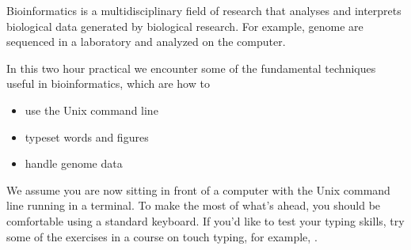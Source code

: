 Bioinformatics is a multidisciplinary field of research that analyses
and interprets biological data generated by biological research. For
example, genome are sequenced in a laboratory and analyzed on the
computer.

In this two hour practical we encounter some of the fundamental
techniques useful in bioinformatics, which are how to
\begin{itemize}
\item use the Unix command line
\item typeset words and figures
\item handle genome data
\end{itemize}
We assume you are now sitting in front of a computer with the Unix
command line running in a terminal. To make the most of what's ahead,
you should be comfortable using a standard keyboard. If you'd like to
test your typing skills, try some of the exercises in a course on
touch typing, for example, .
